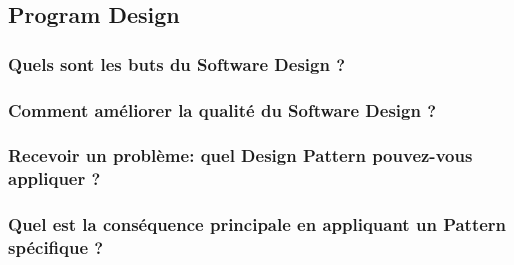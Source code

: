 \subsection{Program Design}

\subsubsection{Quels sont les buts du Software Design ?}
\subsubsection{Comment améliorer la qualité du Software Design ?}
\subsubsection{Recevoir un problème: quel Design Pattern pouvez-vous appliquer ?}
\subsubsection{Quel est la conséquence principale en appliquant un Pattern spécifique ?}